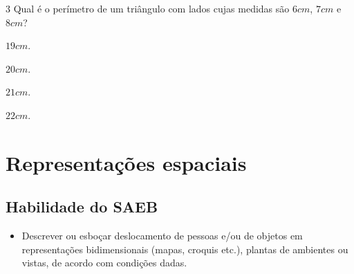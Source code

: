 \num{3} Qual é o perímetro de um triângulo com lados cujas medidas são $6 cm$,
$7 cm$ e $8 cm$?

\begin{escolha}[itemsep=0pt]
\item $19 cm$.
\item $20 cm$.
\item $21 cm$.
\item $22 cm$.
\end{escolha}














\chapter{Representações espaciais}

\section*{Habilidade do SAEB}

\begin{itemize}
  \item Descrever ou esboçar deslocamento de pessoas e/ou de objetos em
representações bidimensionais (mapas, croquis etc.), plantas de
ambientes ou vistas, de acordo com condições dadas.
\end{itemize}


